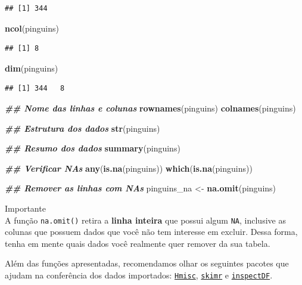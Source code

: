 \documentclass[
]{article}
\newenvironment{Shaded}{\begin{snugshade}}{\end{snugshade}}
\newcommand{\DocumentationTok}[1]{\textcolor[rgb]{0.56,0.35,0.01}{\textbf{\textit{#1}}}}
\newcommand{\FunctionTok}[1]{\textcolor[rgb]{0.13,0.29,0.53}{\textbf{#1}}}
\newcommand{\NormalTok}[1]{#1}
\newcommand{\OtherTok}[1]{\textcolor[rgb]{0.56,0.35,0.01}{#1}}
\begin{document}
\begin{verbatim}
## [1] 344
\end{verbatim}

\begin{Shaded}
\begin{Highlighting}[]
\FunctionTok{ncol}\NormalTok{(pinguins)}
\end{Highlighting}
\end{Shaded}

\begin{verbatim}
## [1] 8
\end{verbatim}

\begin{Shaded}
\begin{Highlighting}[]
\FunctionTok{dim}\NormalTok{(pinguins)}
\end{Highlighting}
\end{Shaded}

\begin{verbatim}
## [1] 344   8
\end{verbatim}

\begin{Shaded}
\begin{Highlighting}[]
\DocumentationTok{\#\# Nome das linhas e colunas}
\FunctionTok{rownames}\NormalTok{(pinguins)}
\FunctionTok{colnames}\NormalTok{(pinguins)}

\DocumentationTok{\#\# Estrutura dos dados}
\FunctionTok{str}\NormalTok{(pinguins)}

\DocumentationTok{\#\# Resumo dos dados}
\FunctionTok{summary}\NormalTok{(pinguins)}

\DocumentationTok{\#\# Verificar NAs}
\FunctionTok{any}\NormalTok{(}\FunctionTok{is.na}\NormalTok{(pinguins))}
\FunctionTok{which}\NormalTok{(}\FunctionTok{is.na}\NormalTok{(pinguins))}

\DocumentationTok{\#\# Remover as linhas com NAs}
\NormalTok{pinguins\_na }\OtherTok{\textless{}{-}} \FunctionTok{na.omit}\NormalTok{(pinguins)}
\end{Highlighting}
\end{Shaded}

Importante \\
A função \texttt{na.omit()} retira a \textbf{linha inteira} que possui algum \texttt{NA}, inclusive as colunas que possuem dados que você não tem interesse em excluir. Dessa forma, tenha em mente quais dados você realmente quer remover da sua tabela.

Além das funções apresentadas, recomendamos olhar os seguintes pacotes que ajudam na conferência dos dados importados: \href{https://cran.r-project.org/web/packages/Hmisc/index.html}{\texttt{Hmisc}}, \href{https://cran.r-project.org/web/packages/skimr.html}{\texttt{skimr}} e \href{https://alastairrushworth.github.io/inspectdf}{\texttt{inspectDF}}.
\end{document}
